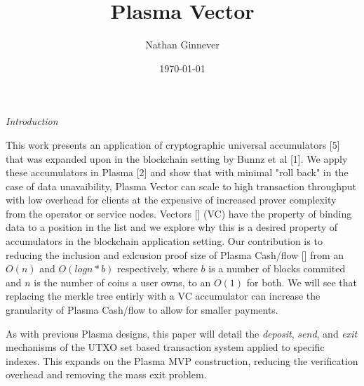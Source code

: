 \documentclass[11pt]{article}
\title{Plasma Vector}
\author{Nathan Ginnever}
\date{\today}
\begin{document}
\maketitle
\centerline{\textit{Introduction}}

This work presents an application of cryptographic universal accumulators [5] that was expanded upon in the blockchain setting by Bunnz et al [1]. We apply these accumulators in Plasma [2] and show that with minimal "roll back" in the case of data unavaibility, Plasma Vector can scale to high transaction throughput with low overhead for clients at the expensive of increased prover complexity from the operator or service nodes. Vectors [] (VC) have the property of binding data to a position in the list and we explore why this is a desired property of accumulators in the blockchain application setting. Our contribution is to reducing the inclusion and exlcusion proof size of Plasma Cash/flow [] from an $O(n)$ and $O(logn*b)$ respectively, where $b$ is a number of blocks commited and $n$ is the number of coins a user owns, to an $O(1)$ for both. We will see that replacing the merkle tree entirly with a VC accumulator can increase the granularity of Plasma Cash/flow to allow for smaller payments.

As with previous Plasma designs, this paper will detail the \textit{deposit}, \textit{send}, and \textit{exit} mechanisms of the UTXO set based transaction system applied to specific indexes. This expands on the Plasma MVP construction, reducing the verification overhead and removing the mass exit problem.
\end{document}
